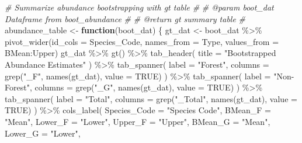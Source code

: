 \documentclass[
]{article}
\newenvironment{Shaded}{\begin{snugshade}}{\end{snugshade}}
\newcommand{\AttributeTok}[1]{\textcolor[rgb]{0.77,0.63,0.00}{#1}}
\newcommand{\CommentTok}[1]{\textcolor[rgb]{0.56,0.35,0.01}{\textit{#1}}}
\newcommand{\ConstantTok}[1]{\textcolor[rgb]{0.00,0.00,0.00}{#1}}
\newcommand{\ControlFlowTok}[1]{\textcolor[rgb]{0.13,0.29,0.53}{\textbf{#1}}}
\newcommand{\FunctionTok}[1]{\textcolor[rgb]{0.00,0.00,0.00}{#1}}
\newcommand{\NormalTok}[1]{#1}
\newcommand{\OtherTok}[1]{\textcolor[rgb]{0.56,0.35,0.01}{#1}}
\newcommand{\SpecialCharTok}[1]{\textcolor[rgb]{0.00,0.00,0.00}{#1}}
\newcommand{\StringTok}[1]{\textcolor[rgb]{0.31,0.60,0.02}{#1}}
\begin{document}
\begin{Shaded}
\begin{Highlighting}[]
\CommentTok{\# Summarize abundance bootstrapping with gt table}
\CommentTok{\#}
\CommentTok{\# @param boot\_dat Dataframe from boot\_abundance}
\CommentTok{\#}
\CommentTok{\# @return gt summary table}
\CommentTok{\#}
\NormalTok{abundance\_table }\OtherTok{\textless{}{-}} \ControlFlowTok{function}\NormalTok{(boot\_dat) \{}
\NormalTok{  gt\_dat }\OtherTok{\textless{}{-}}\NormalTok{ boot\_dat }\SpecialCharTok{\%\textgreater{}\%} 
              \FunctionTok{pivot\_wider}\NormalTok{(}\AttributeTok{id\_cols =}\NormalTok{ Species\_Code,}
                          \AttributeTok{names\_from =}\NormalTok{ Type,}
                          \AttributeTok{values\_from =}\NormalTok{ BMean}\SpecialCharTok{:}\NormalTok{Upper) }
\NormalTok{  gt\_dat }\SpecialCharTok{\%\textgreater{}\%}
    \FunctionTok{gt}\NormalTok{() }\SpecialCharTok{\%\textgreater{}\%}
    \FunctionTok{tab\_header}\NormalTok{( }
      \AttributeTok{title =} \StringTok{"Bootstrapped Abundance Estimates"}
\NormalTok{    ) }\SpecialCharTok{\%\textgreater{}\%}
    \FunctionTok{tab\_spanner}\NormalTok{(}
      \AttributeTok{label =} \StringTok{"Forest"}\NormalTok{,}
      \AttributeTok{columns =} \FunctionTok{grep}\NormalTok{(}\StringTok{"\_F"}\NormalTok{, }\FunctionTok{names}\NormalTok{(gt\_dat), }\AttributeTok{value =} \ConstantTok{TRUE}\NormalTok{)}
\NormalTok{    ) }\SpecialCharTok{\%\textgreater{}\%}
    \FunctionTok{tab\_spanner}\NormalTok{(}
      \AttributeTok{label =} \StringTok{"Non{-}Forest"}\NormalTok{,}
      \AttributeTok{columns =} \FunctionTok{grep}\NormalTok{(}\StringTok{"\_G"}\NormalTok{, }\FunctionTok{names}\NormalTok{(gt\_dat), }\AttributeTok{value =} \ConstantTok{TRUE}\NormalTok{)}
\NormalTok{    ) }\SpecialCharTok{\%\textgreater{}\%}
    \FunctionTok{tab\_spanner}\NormalTok{(}
      \AttributeTok{label =} \StringTok{"Total"}\NormalTok{,}
      \AttributeTok{columns =} \FunctionTok{grep}\NormalTok{(}\StringTok{"\_Total"}\NormalTok{, }\FunctionTok{names}\NormalTok{(gt\_dat), }\AttributeTok{value =} \ConstantTok{TRUE}\NormalTok{)}
\NormalTok{    ) }\SpecialCharTok{\%\textgreater{}\%}
    \FunctionTok{cols\_label}\NormalTok{(}
      \AttributeTok{Species\_Code =} \StringTok{"Species Code"}\NormalTok{,}
      \AttributeTok{BMean\_F =} \StringTok{"Mean"}\NormalTok{,}
      \AttributeTok{Lower\_F =} \StringTok{"Lower"}\NormalTok{,}
      \AttributeTok{Upper\_F =} \StringTok{"Upper"}\NormalTok{,}
      \AttributeTok{BMean\_G =} \StringTok{"Mean"}\NormalTok{,}
      \AttributeTok{Lower\_G =} \StringTok{"Lower"}\NormalTok{,}

\end{Highlighting}
\end{Shaded}
\end{document}
